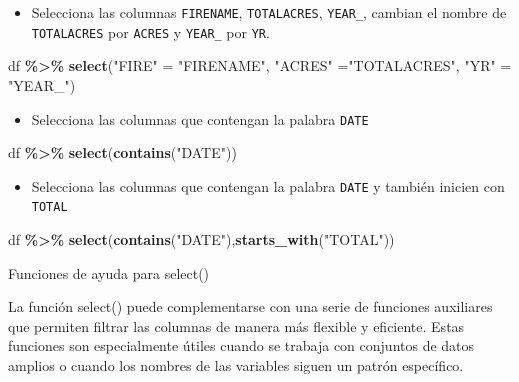 \documentclass[
]{book}
\newenvironment{Shaded}{\begin{snugshade}}{\end{snugshade}}
\newcommand{\FunctionTok}[1]{\textcolor[rgb]{0.13,0.29,0.53}{\textbf{#1}}}
\newcommand{\NormalTok}[1]{#1}
\newcommand{\OtherTok}[1]{\textcolor[rgb]{0.56,0.35,0.01}{#1}}
\newcommand{\SpecialCharTok}[1]{\textcolor[rgb]{0.81,0.36,0.00}{\textbf{#1}}}
\newcommand{\StringTok}[1]{\textcolor[rgb]{0.31,0.60,0.02}{#1}}
\providecommand{\tightlist}{%
  \setlength{\itemsep}{0pt}\setlength{\parskip}{0pt}}
\begin{document}
\begin{itemize}
\tightlist
\item
  Selecciona las columnas \texttt{FIRENAME}, \texttt{TOTALACRES}, \texttt{YEAR\_}, cambian el nombre de \texttt{TOTALACRES} por \texttt{ACRES} y \texttt{YEAR\_} por \texttt{YR}.
\end{itemize}

\begin{Shaded}
\begin{Highlighting}[]
\NormalTok{df }\SpecialCharTok{\%\textgreater{}\%} 
  \FunctionTok{select}\NormalTok{(}\StringTok{"FIRE"} \OtherTok{=} \StringTok{"FIRENAME"}\NormalTok{, }\StringTok{"ACRES"} \OtherTok{=}\StringTok{"TOTALACRES"}\NormalTok{, }\StringTok{"YR"} \OtherTok{=} \StringTok{"YEAR\_"}\NormalTok{)}
\end{Highlighting}
\end{Shaded}

\begin{itemize}
\tightlist
\item
  Selecciona las columnas que contengan la palabra \texttt{DATE}
\end{itemize}

\begin{Shaded}
\begin{Highlighting}[]
\NormalTok{df }\SpecialCharTok{\%\textgreater{}\%} 
  \FunctionTok{select}\NormalTok{(}\FunctionTok{contains}\NormalTok{(}\StringTok{"DATE"}\NormalTok{))}
\end{Highlighting}
\end{Shaded}

\begin{itemize}
\tightlist
\item
  Selecciona las columnas que contengan la palabra \texttt{DATE} y también inicien con \texttt{TOTAL}
\end{itemize}

\begin{Shaded}
\begin{Highlighting}[]
\NormalTok{df }\SpecialCharTok{\%\textgreater{}\%} 
  \FunctionTok{select}\NormalTok{(}\FunctionTok{contains}\NormalTok{(}\StringTok{"DATE"}\NormalTok{),}\FunctionTok{starts\_with}\NormalTok{(}\StringTok{"TOTAL"}\NormalTok{))}
\end{Highlighting}
\end{Shaded}

{} Funciones de ayuda para select()

La función select() puede complementarse con una serie de funciones auxiliares que permiten
filtrar las columnas de manera más flexible y eficiente. Estas funciones son especialmente útiles cuando se trabaja con
conjuntos de datos amplios o cuando los nombres de las variables siguen un patrón específico.
\end{document}
